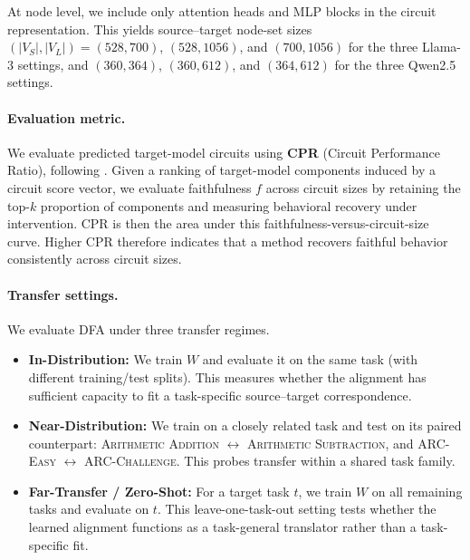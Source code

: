 \documentclass{article} %
\begin{document}
At node level, we include only attention heads and MLP blocks in the circuit representation. This yields source--target node-set sizes $(|V_S|,|V_L|)=(528,700)$, $(528,1056)$, and $(700,1056)$ for the three Llama-3 settings, and $(360,364)$, $(360,612)$, and $(364,612)$ for the three Qwen2.5 settings.



\paragraph{Evaluation metric.}
We evaluate predicted target-model circuits using \textbf{CPR} (Circuit Performance Ratio), following \citet{mib-2025}. Given a ranking of target-model components induced by a circuit score vector, we evaluate faithfulness $f$ across circuit sizes by retaining the top-$k$ proportion of components and measuring behavioral recovery under intervention. CPR is then the area under this faithfulness-versus-circuit-size curve. Higher CPR therefore indicates that a method recovers faithful behavior consistently across circuit sizes.




\paragraph{Transfer settings.}
We evaluate DFA under three transfer regimes.

\begin{itemize}[leftmargin=*,nosep]
    \item \textbf{In-Distribution:} We train $W$ and evaluate it on the same task (with different training/test splits). This measures whether the alignment has sufficient capacity to fit a task-specific source--target correspondence.
    \item \textbf{Near-Distribution:} We train on a closely related task and test on its paired counterpart: \textsc{Arithmetic Addition} $\leftrightarrow$ \textsc{Arithmetic Subtraction}, and \textsc{ARC-Easy} $\leftrightarrow$ \textsc{ARC-Challenge}. This probes transfer within a shared task family.
    \item \textbf{Far-Transfer / Zero-Shot:} For a target task $t$, we train $W$ on all remaining tasks and evaluate on $t$. This leave-one-task-out setting tests whether the learned alignment functions as a task-general translator rather than a task-specific fit.
\end{itemize}
\end{document}

